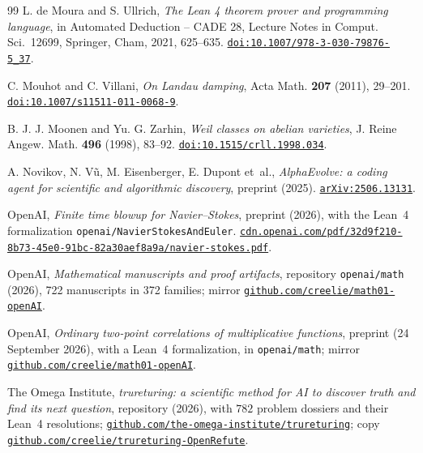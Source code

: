 \begin{thebibliography}{99}
L. de Moura and S. Ullrich,
\emph{The Lean 4 theorem prover and programming language},
in Automated Deduction -- CADE 28, Lecture Notes in Comput. Sci.~12699, Springer, Cham, 2021, 625--635.
\href{https://doi.org/10.1007/978-3-030-79876-5_37}{\nolinkurl{doi:10.1007/978-3-030-79876-5_37}}.

C. Mouhot and C. Villani,
\emph{On Landau damping},
Acta Math. \textbf{207} (2011), 29--201.
\href{https://doi.org/10.1007/s11511-011-0068-9}{\nolinkurl{doi:10.1007/s11511-011-0068-9}}.

B. J. J. Moonen and Yu. G. Zarhin,
\emph{Weil classes on abelian varieties},
J. Reine Angew. Math. \textbf{496} (1998), 83--92.
\href{https://doi.org/10.1515/crll.1998.034}{\nolinkurl{doi:10.1515/crll.1998.034}}.

A. Novikov, N. V\~u, M. Eisenberger, E. Dupont et~al.,
\emph{AlphaEvolve: a coding agent for scientific and algorithmic discovery},
preprint (2025).
\href{https://arxiv.org/abs/2506.13131}{\nolinkurl{arXiv:2506.13131}}.

OpenAI,
\emph{Finite time blowup for Navier--Stokes},
preprint (2026), with the Lean~4 formalization \texttt{openai/NavierStokesAndEuler}.
\href{https://cdn.openai.com/pdf/32d9f210-8b73-45e0-91bc-82a30aef8a9a/navier-stokes.pdf}{\nolinkurl{cdn.openai.com/pdf/32d9f210-8b73-45e0-91bc-82a30aef8a9a/navier-stokes.pdf}}.

OpenAI,
\emph{Mathematical manuscripts and proof artifacts}, repository \texttt{openai/math} (2026), 722 manuscripts in 372 families;
mirror \href{https://github.com/creelie/math01-openAI}{\nolinkurl{github.com/creelie/math01-openAI}}.

OpenAI,
\emph{Ordinary two-point correlations of multiplicative functions},
preprint (24 September 2026), with a Lean~4 formalization, in \texttt{openai/math};
mirror \href{https://github.com/creelie/math01-openAI}{\nolinkurl{github.com/creelie/math01-openAI}}.

The Omega Institute,
\emph{trureturing: a scientific method for AI to discover truth and find its next question}, repository (2026), with $782$ problem dossiers and their Lean~4 resolutions;
\href{https://github.com/the-omega-institute/trureturing}{\nolinkurl{github.com/the-omega-institute/trureturing}}; copy \href{https://github.com/creelie/trureturing-OpenRefute}{\nolinkurl{github.com/creelie/trureturing-OpenRefute}}.


\end{thebibliography}
